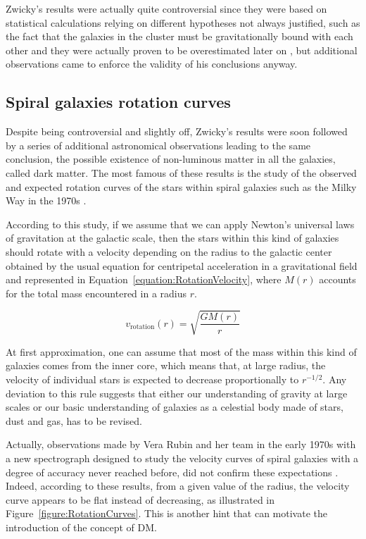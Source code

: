 \documentclass[a4paper, 10pt, openright]{report}
\begin{document}
Zwicky's results were actually quite controversial since they were based on statistical calculations relying on different hypotheses not always justified, such as the fact that the galaxies in the cluster must be gravitationally bound with each other and they were actually proven to be overestimated later on \cite{ZwickyWrong}, but additional observations came to enforce the validity of his conclusions anyway.

\subsection{Spiral galaxies rotation curves}

Despite being controversial and slightly off, Zwicky's results were soon followed by a series of additional astronomical observations leading to the same conclusion, the possible existence of non-luminous matter in all the galaxies, called dark matter. The most famous of these results is the study of the observed and expected rotation curves of the stars within spiral galaxies such as the Milky Way in the 1970s \cite{RotationCurves}. 

According to this study, if we assume that we can apply Newton's universal laws of gravitation at the galactic scale, then the stars within this kind of galaxies should rotate with a velocity depending on the radius to the galactic center obtained by the usual equation for centripetal acceleration in a gravitational field and represented in Equation~\ref{equation:RotationVelocity}, where $M(r)$ accounts for the total mass encountered in a radius $r$.

\begin{equation} \label{equation:RotationVelocity}
v_{\text{rotation}}(r) = \sqrt{\frac{G M(r)}{r}}
\end{equation}

At first approximation, one can assume that most of the mass within this kind of galaxies comes from the inner core, which means that, at large radius, the velocity of individual stars is expected to decrease proportionally to $r^{-1/2}$. Any deviation to this rule suggests that either our understanding of gravity at large scales or our basic understanding of galaxies as a celestial body made of stars, dust and gas, has to be revised.

Actually, observations made by Vera Rubin and her team in the early 1970s with a new spectrograph designed to study the velocity curves of spiral galaxies with a degree of accuracy never reached before, did not confirm these expectations \cite{VeraRubin}. Indeed, according to these results, from a given value of the radius, the velocity curve appears to be flat instead of decreasing, as illustrated in Figure~\ref{figure:RotationCurves}. This is another hint that can motivate the introduction of the concept of \ac{DM}.
\end{document}

